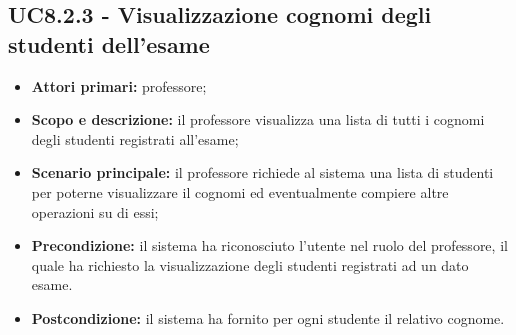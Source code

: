 \documentclass[AnalisiDeiRequisiti.tex]{subfiles}
\begin{document}
\subsection{UC8.2.3 - Visualizzazione cognomi degli studenti dell'esame}
\begin{itemize}
	\item \textbf{Attori primari:} professore;
	\item \textbf{Scopo e descrizione:} il professore visualizza una lista di tutti i cognomi degli studenti registrati all'esame;
	\item \textbf{Scenario principale:} il professore richiede al sistema una lista di studenti per poterne visualizzare il cognomi ed eventualmente compiere altre operazioni su di essi;
	\item \textbf{Precondizione:} il sistema ha riconosciuto l'utente nel ruolo del professore, il quale ha richiesto la visualizzazione degli studenti registrati ad un dato esame.
	\item \textbf{Postcondizione:} il sistema ha fornito per ogni studente il relativo cognome.
\end{itemize}
\end{document}
